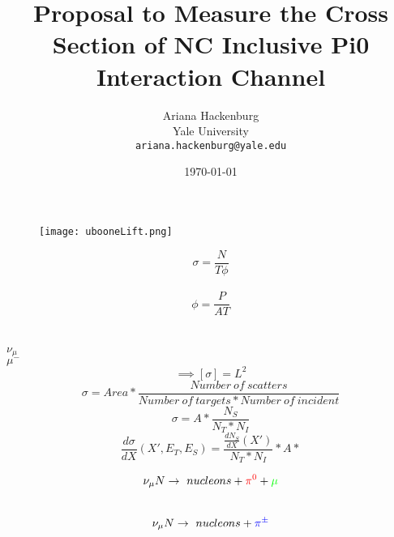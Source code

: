 \documentclass[12pt]{article}
\begin{document}
\title{Proposal to Measure the Cross Section of NC Inclusive Pi0 Interaction Channel }
\author{Ariana Hackenburg  \\Yale University \\ 
			\texttt{ariana.hackenburg@yale.edu}}
\date{\today}
\maketitle

\begin{figure}[h!]
\centering
\texttt{[image: ubooneLift.png]}
\end{figure}

\clearpage

\pagestyle{fancy}%
\fancyhead[C]{}
\renewcommand{\headrulewidth}{0.4pt}%

\tableofcontents
\listoffigures
\setcounter{tocdepth}{3} 

\clearpage

\begin{equation} 
\sigma = \frac{N}{T\phi}
\end{equation}
\\
\begin{equation} 
\phi = \frac{P}{AT}
\end{equation}
\\
\\$\nu_\mu$
\\$\mu^-$
\begin{equation} 
\implies [\sigma] = L^2
\end{equation}
\begin{equation} 
\sigma = Area * \frac{Number\ of\ scatters}{Number\ of\ targets * Number\ of\ incident}
\end{equation}
\begin{equation} 
\sigma = A * \frac{N_S}{N_T* N_I}
\end{equation}
\begin{equation} 
\frac{d\sigma}{dX}(X',E_T,E_S)=\frac{\frac{dN_S}{dX}(X')}{N_T*N_I}*A*
\end{equation}

\begin{equation} 
\nu_\mu N \rightarrow \ nucleons + \textcolor{red}{\pi^0} + \textcolor{green}{\mu} 
\end{equation}
\\
\begin{equation} 
\nu_\mu N \rightarrow \ nucleons + \textcolor{blue}{\pi^\pm}
\end{equation}
\end{document}
